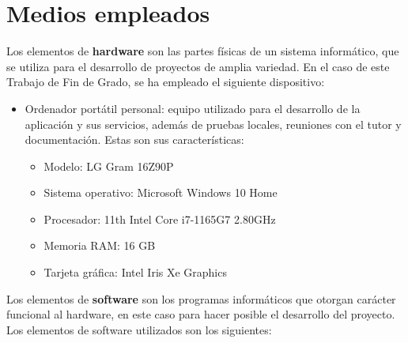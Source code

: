 \section{Medios empleados}

Los elementos de \textbf{hardware} son las partes físicas de un sistema informático, que se utiliza para el desarrollo de proyectos de amplia variedad. En el caso de este Trabajo de Fin de Grado, se ha empleado el siguiente dispositivo:

\begin{itemize}
    \item Ordenador portátil personal: equipo utilizado para el desarrollo de la aplicación y sus servicios, además de pruebas locales, reuniones con el tutor y documentación. Estas son sus características:
    \begin{itemize}
        \item Modelo: LG Gram 16Z90P
        \item Sistema operativo: Microsoft Windows 10 Home
        \item Procesador: 11th Intel Core i7-1165G7 2.80GHz
        \item Memoria RAM: 16 GB
        \item Tarjeta gráfica: Intel Iris Xe Graphics
    \end{itemize}
\end{itemize}

Los elementos de \textbf{software} son los programas informáticos que otorgan carácter funcional al hardware, en este caso para hacer posible el desarrollo del proyecto. Los elementos de software utilizados son los siguientes:

